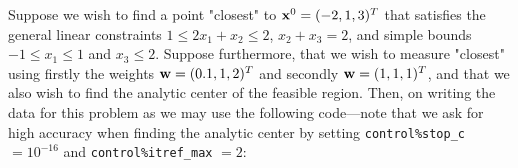 \documentclass{galahad}
\begin{document}
\galexample
Suppose we wish to find a point "closest" to
${\mathbf{x}}^{0}  =  ( -2, 1, 3 )^{T}$
that satisfies the general linear constraints
$1 \leq  2 x_{1}  +  x_{2}  \leq  2$, 
$x_{2}  +  x_{3}  =  2$, and simple bounds
$-1  \leq  x_{1}  \leq  1$ and $x_{3}  \leq  2$.
Suppose furthermore, that we wish to measure "closest" using
firstly the weights ${\mathbf{w}}  =  ( 0.1, 1, 2 )^{T}$
and secondly ${\mathbf{w}}  =  ( 1, 1, 1 )^{T}$, and that we also
wish to find the analytic center of the feasible region.
Then, on writing the data for this problem as
we may use the following code---note that we ask for high accuracy
when finding the analytic center by setting
{\tt control\%stop\_c} $= 10^{-16}$ and {\tt control\%itref\_max} $= 2$:
\end{document}
